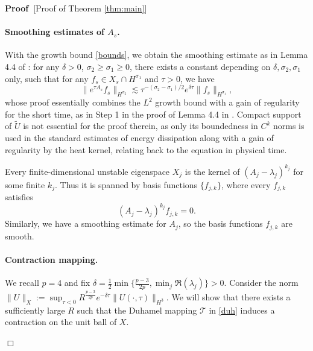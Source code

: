 \documentclass[11pt,a4paper]{article}
\numberwithin{equation}{section}
\newcommand{\assign}{:=}
\newenvironment{proof}{\noindent\textbf{Proof\ }}{\hspace*{\fill}$\Box$\medskip}
\begin{document}
\begin{proof}[Proof of Theorem \ref{thm:main}]
\paragraph{Smoothing estimates of $A_s$.} With the growth bound \eqref{bounds}, we obtain the smoothing estimate as in Lemma 4.4 of \cite{albritton2022non}: for any $\delta>0$, $\sigma_2\geqslant \sigma_1\geqslant0$, there exists a constant depending on $\delta,\sigma_2,\sigma_1$ only, such that for any $f_s\in X_s\cap H^{\sigma_1}$ and $\tau>0$, we have \begin{equation}
    \|e^{\tau A_s}f_s\|_{H^{\sigma_2}}\lesssim \tau^{-(\sigma_2-\sigma_1)/2} e^{\delta\tau}\|f_s\|_{H^{\sigma_1}},%
    \label{smooth eqn}
\end{equation}
whose proof essentially combines the $L^2$ growth bound with a gain of regularity for the short time, as in Step 1 in the proof of Lemma 4.4 in \cite{albritton2022non}. Compact support of $\widetilde{U}$ is not essential for the proof therein, as only its boundedness in $C^k$ norms is used in the standard estimates of energy dissipation along with a gain of regularity by the heat kernel, relating back to the equation in physical time.

Every finite-dimensional unstable eigenspace $X_j$ is the kernel of $(A_j-\lambda_j)^{k_j}$ for some finite $k_j$. Thus it is spanned by basis functions $\{f_{j,k}\}$, where every $f_{j,k}$ satisfies
\[
(A_j-\lambda_j)^{k_j} f_{j,k} = 0.
\]
Similarly, we have a smoothing estimate for $A_j$, so the basis functions $f_{j,k}$ are smooth. 
\paragraph{Contraction mapping.} We recall $p=4$ and fix $\delta=\frac{1}{2}\min\{\frac{p-3}{2p},\min_j\Re(\lambda_j)\}>0$. Consider the norm $\|U\|_X\assign\sup _{\tau<0} R^{\frac{p-3}{2p}}e^{-\delta\tau}\|U(\cdot,\tau)\|_{H^3}$. We will show that there exists a sufficiently large $R$ such that the Duhamel mapping $\mathcal{T}$ in \eqref{duh} induces a contraction on the unit ball of $X$. 


\end{proof}
\end{document}

